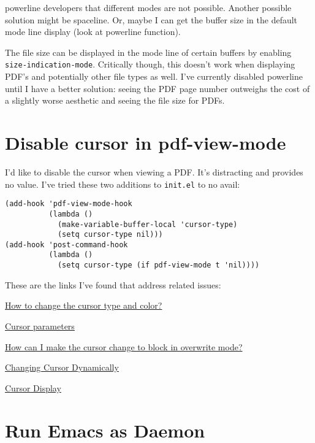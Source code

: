 \documentclass{default}
\begin{document}
powerline developers that different modes are not possible. Another possible solution might be
spaceline. Or, maybe I can get the buffer size in the default mode line display (look at powerline
function).

The file size can be displayed in the mode line of certain buffers by enabling
\texttt{size-indication-mode}. Critically though, this doesn't work when displaying PDF's
and potentially other file types as well. I've currently disabled powerline until I have a better
solution: seeing the PDF page number outweighs the cost of a slightly worse aesthetic and seeing the
file size for PDFs.

\section{Disable cursor in pdf-view-mode}

I'd like to disable the cursor when viewing a PDF. It's distracting and provides no value. I've
tried these two additions to \texttt{init.el} to no avail:

\begin{verbatim}
(add-hook 'pdf-view-mode-hook
          (lambda ()
            (make-variable-buffer-local 'cursor-type)
            (setq cursor-type nil)))
(add-hook 'post-command-hook
          (lambda ()
            (setq cursor-type (if pdf-view-mode t 'nil))))
\end{verbatim}

These are the links I've found that address related issues:

\href{https://emacs.stackexchange.com/questions/392/how-to-change-the-cursor-type-and-color}{How to
  change the cursor type and color?}

\href{https://www.gnu.org/software/emacs/manual/html_node/elisp/Cursor-Parameters.html}{Cursor
  parameters}

\href{https://emacs.stackexchange.com/questions/44650/how-can-i-make-the-cursor-change-to-block-in-overwrite-mode?rq=1}{How
  can I make the cursor change to block in overwrite mode?}

\href{https://www.emacswiki.org/emacs/ChangingCursorDynamically}{Changing Cursor Dynamically}

\href{https://www.gnu.org/software/emacs/manual/html_node/emacs/Cursor-Display.html}{Cursor Display}


\section{Run Emacs as Daemon}
\end{document}
